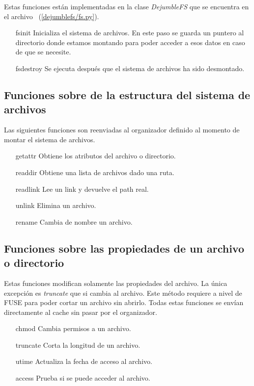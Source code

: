 Estas funciones están implementadas en la clase \textit{DejumbleFS} que se encuentra en el archivo ~(\ref{dejumblefs/fs.py}). 

\begin{itemize}
\item[fsinit] Inicializa el sistema de archivos. En este paso se guarda un puntero al directorio donde estamos montando para poder acceder a esos datos en caso de que se necesite.
\item[fsdestroy] Se ejecuta después que el sistema de archivos ha sido desmontado.
\end{itemize}

\subsection{Funciones sobre de la estructura del sistema de archivos}

Las siguientes funciones son reenviadas al organizador definido al momento de montar el sistema de archivos.

\begin{itemize}
\item[getattr] Obtiene los atributos del archivo o directorio.
\item[readdir] Obtiene una lista de archivos dado una ruta.
\item[readlink] Lee un link	y devuelve el path real.
\item[unlink] Elimina un archivo.
\item[rename] Cambia de nombre un archivo.
\end{itemize}

\subsection{Funciones sobre las propiedades de un archivo o directorio}

Estas funciones modifican solamente las propiedades del archivo. La única excepción es  \textit{truncate} que si cambia al archivo. Este método requiere a nivel de FUSE para poder cortar un archivo sin abrirlo. Todas estas funciones se envían directamente al cache sin pasar por el organizador.

\begin{itemize}
\item[chmod] Cambia permisos a un archivo.
\item[truncate] Corta la longitud de un archivo.
\item[utime] Actualiza la fecha de acceso al archivo.
\item[access] Prueba si se puede acceder al archivo.
\end{itemize}


